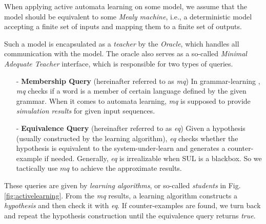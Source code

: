 \documentclass[conference, a4paper]{IEEEtran}
\begin{document}
When applying active automata learning on some model, we assume that the model should be equivalent
to some \emph{Mealy machine}, i.e., a deterministic model accepting a finite set of inputs and
mapping them to a finite set of outputs.

Such a model is encapsulated as a \emph{teacher} by the \emph{Oracle}, which handles
all communication with the model. The oracle also serves as a so-called \emph{Minimal Adequate
Teacher} \cite{DBLP:journals/iandc/Angluin87}
interface, which is responsible for two types of queries.

\begin{itemize}
  \item[-] \textbf{Membership Query} (hereinafter referred to as \emph{mq}) In grammar-learning
    \cite{DBLP:journals/iandc/Angluin87}, \emph{mq} checks if a word is a member of certain language
    defined by the given grammar. When it comes to
    automata learning, \emph{mq} is supposed to provide \emph{simulation results} for given input
    sequences.
  \item[-] \textbf{Equivalence Query} (hereinafter referred to as \emph{eq}) Given a hypothesis
    (usually constructed by the learning algorithm), \emph{eq} checks whether the hypothesis is
    equivalent to the system-under-learn and generates a counter-example if needed. Generally,
    \emph{eq} is irrealizable when SUL is a blackbox. So we tactically use $mq$ to achieve the
    approximate results.
\end{itemize}

These queries are given by \emph{learning algorithms}, or so-called \emph{students} in Fig.
\ref{fig:activelearning}. From the \emph{mq} results, a learning algorithm constructs a
\emph{hypothesis} and then check it with \emph{eq}. If counter-examples are found, we turn back and
repeat the hypothesis construction until the equivalence query returns \emph{true}.




\end{document}
